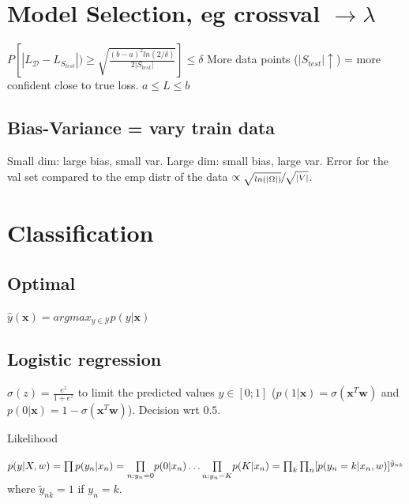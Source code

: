 \section{Model Selection, eg crossval $\rightarrow\lambda$}
$P\left[|L_\mathcal{D}-L_{S_{test}}|)\ge \sqrt{\frac{(b-a)^2ln(2/\delta)}{2|S_{test}|}}\right]\leq \delta$ More data points ($|S_{test}|\uparrow$) =  more confident close to true loss. $a\leq L\leq b$
\subsection{Bias-Variance = vary train data}
Small dim: large bias, small var.
Large dim: small bias, large var.
Error for the val set compared to the emp distr of the data $\propto \sfrac{\sqrt{ln(|\Omega|)}}{\sqrt{|V|}}$.


\section{Classification}
\subsection{Optimal}
$\hat{y}(\mathbf{x}) = argmax_{y\in \mathcal{Y}} p(y|\mathbf{x})$

\subsection{Logistic regression}\label{logreg}
$\sigma(z) = \frac{e^z}{1+e^z}$ to limit the predicted values $y\in [0;1]$ ($p(1|\mathbf{x}) = \sigma(\mathbf{x}^T\mathbf{w})$ and $p(0|\mathbf{x}) = 1-\sigma(\mathbf{x}^T\mathbf{w})$). Decision wrt $0.5$.

Likelihood

$p(y | X,w) = \prod p(y_n|x_n) \newline =\underset{n:y_n=0}{\prod} p(0|x_n) \dots \underset{n:y_n=K}{\prod} p(K|x_n) \newline = \prod_k \prod_n [p(y_n = k | x_n,w)]^{\tilde{y}_{nk}}$ \newline where ${\tilde{y}_{nk}} = 1$ if $y_n=k$.

